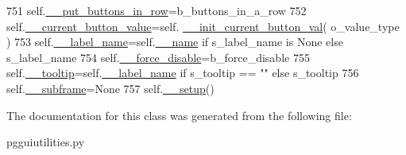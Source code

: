 \begin{DoxyCode}
751         self.\hyperlink{classnegui_1_1pgguiutilities_1_1KeyCategoricalValueFrame_a869087c9cc908de0226eec78cb4282bb}{\_\_put\_buttons\_in\_row}=b\_buttons\_in\_a\_row
752         self.\hyperlink{classnegui_1_1pgguiutilities_1_1KeyCategoricalValueFrame_aa1bb987386f2e559c6de976b745f185e}{\_\_current\_button\_value}=self.
      \hyperlink{classnegui_1_1pgguiutilities_1_1KeyCategoricalValueFrame_ab1e309b3e63c5c4a57d37d2a61f4e90d}{\_\_init\_current\_button\_val}( o\_value\_type )
753         self.\hyperlink{classnegui_1_1pgguiutilities_1_1KeyCategoricalValueFrame_a3a453ac47871c2f8b894442fd3ef5d07}{\_\_label\_name}=self.\hyperlink{classnegui_1_1pgguiutilities_1_1KeyCategoricalValueFrame_a92a1947d6110ada3bd813cc8e84d84ad}{\_\_name} \textcolor{keywordflow}{if} s\_label\_name \textcolor{keywordflow}{is} \textcolor{keywordtype}{None} \textcolor{keywordflow}{else} s\_label\_name
754         self.\hyperlink{classnegui_1_1pgguiutilities_1_1KeyCategoricalValueFrame_a01ea2795b9136b4fab5d6fe78dc2947d}{\_\_force\_disable}=b\_force\_disable
755         self.\hyperlink{classnegui_1_1pgguiutilities_1_1KeyCategoricalValueFrame_ae2f1424ab33f1ff0c9477dcf401748ca}{\_\_tooltip}=self.\hyperlink{classnegui_1_1pgguiutilities_1_1KeyCategoricalValueFrame_a3a453ac47871c2f8b894442fd3ef5d07}{\_\_label\_name} \textcolor{keywordflow}{if} s\_tooltip == \textcolor{stringliteral}{""} \textcolor{keywordflow}{else} s\_tooltip
756         self.\hyperlink{classnegui_1_1pgguiutilities_1_1KeyCategoricalValueFrame_ad2350dd7438d98d077c86e8295425ca0}{\_\_subframe}=\textcolor{keywordtype}{None}
757         self.\hyperlink{classnegui_1_1pgguiutilities_1_1KeyCategoricalValueFrame_a1e890256208ab06e21db468c7aed6bd8}{\_\_setup}()
\end{DoxyCode}


The documentation for this class was generated from the following file\+:\begin{DoxyCompactItemize}
\item 
pgguiutilities.\+py\end{DoxyCompactItemize}
